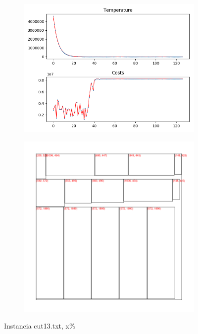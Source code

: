\begin{figure}
\centering
\begin{subfigure}{.5\textwidth}
  \centering
  \includegraphics[width=1\linewidth]{results/cut13/1/plot}
  \label{fig:sub1}
\end{subfigure}%
\begin{subfigure}{.5\textwidth}
  \centering
  \includegraphics[width=1\linewidth]{results/cut13/1/cut}
  \label{fig:sub2}
\end{subfigure}
\caption{Instancia cut13.txt, x\%}
\label{fig:test}
\end{figure}


